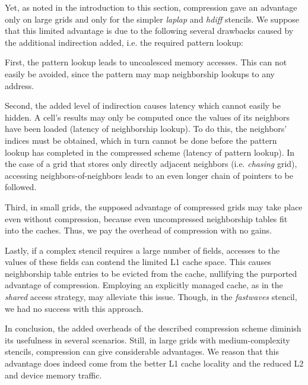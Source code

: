 Yet, as noted in the introduction to this section, compression gave an advantage only on large grids and only for the simpler \emph{laplap} and \emph{hdiff} stencils. We suppose that this limited advantage is due to the following several drawbacks caused by the additional indirection added, i.e. the required pattern lookup:

First, the pattern lookup leads to uncoalesced memory accesses. This can not easily be avoided, since the pattern may map neighborship lookups to any address.

Second, the added level of indirection causes latency which cannot easily be hidden. A cell's results may only be computed once the values of its neighbors have been loaded (latency of neighborship lookup). To do this, the neighbors' indices must be obtained, which in turn cannot be done before the pattern lookup has completed in the compressed scheme (latency of pattern lookup). In the case of a grid that stores only directly adjacent neighbors (i.e. \emph{chasing} grid), accessing neighbors-of-neighbors leads to an even longer chain of pointers to be followed.

Third, in small grids, the supposed advantage of compressed grids may take place even without compression, because even uncompressed neighborship tables fit into the caches. Thus, we pay the overhead of compression with no gains.

Lastly, if a complex stencil requires a large number of fields, accesses to the values of these fields can contend the limited L1 cache space. This causes neighborship table entries to be evicted from the cache, nullifying the purported advantage of compression. Employing an explicitly managed cache, as in the \emph{shared} access strategy, may alleviate this issue. Though, in the \emph{fastwaves} stencil, we had no success with this approach.

In conclusion, the added overheads of the described compression scheme diminish its usefulness in several scenarios. Still, in large grids with medium-complexity stencils, compression can give considerable advantages. We reason that this advantage does indeed come from the better L1 cache locality and the reduced L2 and device memory traffic. 

% 

